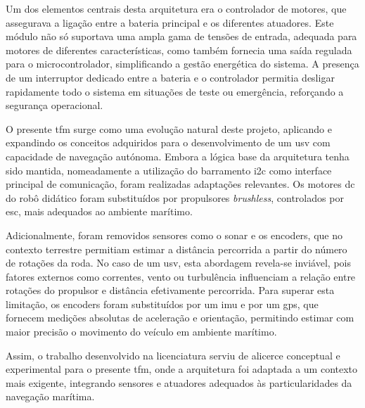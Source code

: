 Um dos elementos centrais desta arquitetura era o controlador de motores, que assegurava a ligação entre a bateria principal e os diferentes atuadores. Este módulo não só suportava uma ampla gama de tensões de entrada, adequada para motores de diferentes características, como também fornecia uma saída regulada para o microcontrolador, simplificando a gestão energética do sistema. A presença de um interruptor dedicado entre a bateria e o controlador permitia desligar rapidamente todo o sistema em situações de teste ou emergência, reforçando a segurança operacional.  

O presente \gls{tfm} surge como uma evolução natural deste projeto, aplicando e expandindo os conceitos adquiridos para o desenvolvimento de um \gls{usv} com capacidade de navegação autónoma. Embora a lógica base da arquitetura tenha sido mantida, nomeadamente a utilização do barramento \gls{i2c} como interface principal de comunicação, foram realizadas adaptações relevantes. Os motores \gls{dc} do robô didático foram substituídos por propulsores \emph{brushless}, controlados por \gls{esc}, mais adequados ao ambiente marítimo.  

Adicionalmente, foram removidos sensores como o sonar e os encoders, que no contexto terrestre permitiam estimar a distância percorrida a partir do número de rotações da roda. No caso de um \gls{usv}, esta abordagem revela-se inviável, pois fatores externos como correntes, vento ou turbulência influenciam a relação entre rotações do propulsor e distância efetivamente percorrida. Para superar esta limitação, os encoders foram substituídos por um \gls{imu} e por um \gls{gps}, que fornecem medições absolutas de aceleração e orientação, permitindo estimar com maior precisão o movimento do veículo em ambiente marítimo.  

Assim, o trabalho desenvolvido na licenciatura serviu de alicerce conceptual e experimental para o presente \gls{tfm}, onde a arquitetura foi adaptada a um contexto mais exigente, integrando sensores e atuadores adequados às particularidades da navegação marítima.
